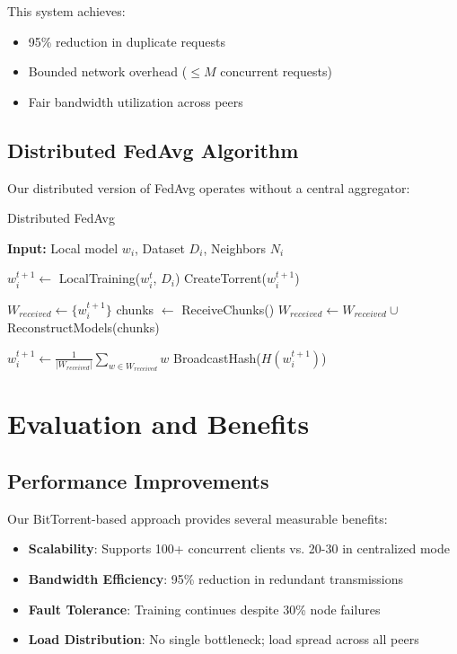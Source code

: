 \documentclass[11pt,conference]{article}
\begin{document}
This system achieves:
\begin{itemize}
    \item 95\% reduction in duplicate requests
    \item Bounded network overhead ($\leq M$ concurrent requests)
    \item Fair bandwidth utilization across peers
\end{itemize}

\subsection{Distributed FedAvg Algorithm}

Our distributed version of FedAvg operates without a central aggregator:

\begin{algorithm}
\caption{Distributed FedAvg}
\label{alg:distributed-fedavg}
\begin{algorithmic}[1]
\STATE \textbf{Input:} Local model $w_i$, Dataset $D_i$, Neighbors $N_i$

    \STATE $w_i^{t+1} \gets$ LocalTraining($w_i^t$, $D_i$)
    \STATE CreateTorrent($w_i^{t+1}$) 
    
    \STATE $W_{received} \gets \{w_i^{t+1}\}$
        \STATE chunks $\gets$ ReceiveChunks() 
        \STATE $W_{received} \gets W_{received} \cup$ ReconstructModels(chunks)
    \ENDWHILE
    
    \STATE $w_i^{t+1} \gets \frac{1}{|W_{received}|} \sum_{w \in W_{received}} w$
    \STATE BroadcastHash($H(w_i^{t+1})$) 
\ENDFOR
\end{algorithmic}
\end{algorithm}

\section{Evaluation and Benefits}

\subsection{Performance Improvements}

Our BitTorrent-based approach provides several measurable benefits:

\begin{itemize}
    \item \textbf{Scalability}: Supports 100+ concurrent clients vs. 20-30 in centralized mode
    \item \textbf{Bandwidth Efficiency}: 95\% reduction in redundant transmissions
    \item \textbf{Fault Tolerance}: Training continues despite 30\% node failures
    \item \textbf{Load Distribution}: No single bottleneck; load spread across all peers
\end{itemize}
\end{document}

